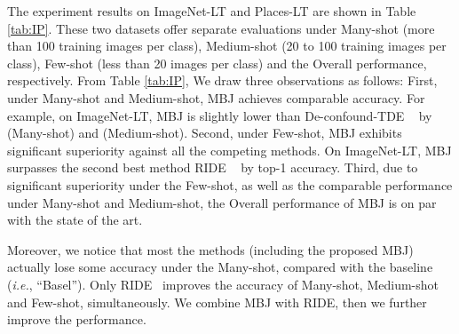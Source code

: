 \documentclass[final]{cvpr}
\def\ie{\textit{i.e.}}
\begin{document}
The experiment results on ImageNet-LT and Places-LT are shown in Table \ref{tab:IP}. 
These two datasets offer separate evaluations under Many-shot (more than 100 training images per class), Medium-shot (20 to 100 training images per class), Few-shot (less than 20 images per class) and the Overall performance, respectively. 
From Table \ref{tab:IP}, We draw three observations as follows: First, under Many-shot and Medium-shot, MBJ achieves comparable accuracy. For example, on ImageNet-LT, MBJ is slightly lower than De-confound-TDE ~\cite{tang2020long} by  (Many-shot) and  (Medium-shot). Second, under Few-shot, MBJ exhibits significant superiority against all the competing methods. On ImageNet-LT, MBJ surpasses the second best method RIDE ~\cite{wang2020long} by  top-1 accuracy. Third, due to significant superiority under the Few-shot, as well as the comparable performance under Many-shot and Medium-shot, the Overall performance of MBJ is on par with the state of the art. 

Moreover, we notice that most the methods (including the proposed MBJ) actually lose some accuracy under the Many-shot, compared with the baseline (\ie, ``Basel''). Only RIDE~\cite{wang2020long} improves the accuracy of Many-shot, Medium-shot and Few-shot, simultaneously. We combine MBJ with RIDE, then we further improve the performance. 
\end{document}
